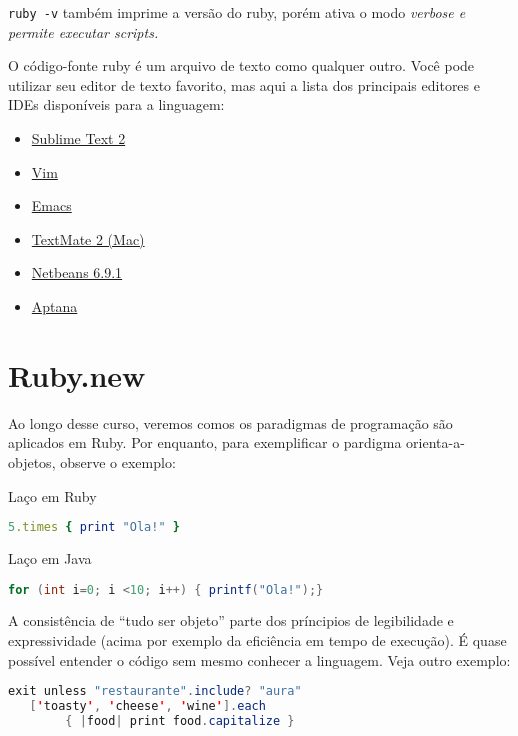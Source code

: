 \documentclass[serif,mathserif]{book}
\newcommand*{\Package}[1]{\texttt{#1}}%
\begin{document}
\Package{ruby -v} também imprime a versão do ruby, porém ativa o modo \em{verbose} e permite executar scripts.

O código-fonte ruby é um arquivo de texto como qualquer outro. Você pode utilizar seu editor de texto favorito, mas aqui a lista dos principais editores e IDEs
disponíveis para a linguagem: 

\begin{itemize}
\item \href{http://www.sublimetext.com/2}{Sublime Text 2}
\item \href{http://www.vim.org/}{Vim}
\item \href{http://www.gnu.org/software/emacs/}{Emacs}
\item \href{https://github.com/textmate/textmate/}{TextMate 2 (Mac)}
\item \href{https://netbeans.org/downloads/6.9.1/index.html}{Netbeans 6.9.1}
\item \href{http://www.aptana.com/}{Aptana}
\end{itemize}

 

\section{Ruby.new}

Ao longo desse curso, veremos comos os paradigmas de programação são aplicados em Ruby. Por enquanto, para exemplificar o pardigma orienta-a-objetos,
observe o exemplo:

Laço em Ruby
\begin{lstlisting}[language=ruby]
5.times { print "Ola!" }
\end{lstlisting}

Laço em Java
\begin{lstlisting}[language=java]
for (int i=0; i <10; i++) { printf("Ola!");}
\end{lstlisting}

A consistência de ``tudo ser objeto''\cite{abadi_theory_1996} parte dos príncipios de legibilidade e expressividade 
(acima por exemplo da eficiência em tempo de execução). É quase possível entender o código sem mesmo conhecer a linguagem. 
Veja outro exemplo:

\begin{lstlisting}[language=java]
   exit unless "restaurante".include? "aura"
   ['toasty', 'cheese', 'wine'].each 
        { |food| print food.capitalize }
\end{lstlisting}
\end{document}
